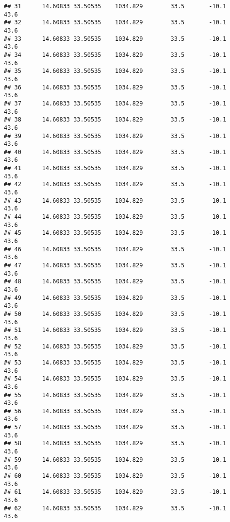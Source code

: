 \documentclass[]{article}
\begin{document}
\begin{verbatim}
## 31      14.60833 33.50535    1034.829        33.5       -10.1              43.6
## 32      14.60833 33.50535    1034.829        33.5       -10.1              43.6
## 33      14.60833 33.50535    1034.829        33.5       -10.1              43.6
## 34      14.60833 33.50535    1034.829        33.5       -10.1              43.6
## 35      14.60833 33.50535    1034.829        33.5       -10.1              43.6
## 36      14.60833 33.50535    1034.829        33.5       -10.1              43.6
## 37      14.60833 33.50535    1034.829        33.5       -10.1              43.6
## 38      14.60833 33.50535    1034.829        33.5       -10.1              43.6
## 39      14.60833 33.50535    1034.829        33.5       -10.1              43.6
## 40      14.60833 33.50535    1034.829        33.5       -10.1              43.6
## 41      14.60833 33.50535    1034.829        33.5       -10.1              43.6
## 42      14.60833 33.50535    1034.829        33.5       -10.1              43.6
## 43      14.60833 33.50535    1034.829        33.5       -10.1              43.6
## 44      14.60833 33.50535    1034.829        33.5       -10.1              43.6
## 45      14.60833 33.50535    1034.829        33.5       -10.1              43.6
## 46      14.60833 33.50535    1034.829        33.5       -10.1              43.6
## 47      14.60833 33.50535    1034.829        33.5       -10.1              43.6
## 48      14.60833 33.50535    1034.829        33.5       -10.1              43.6
## 49      14.60833 33.50535    1034.829        33.5       -10.1              43.6
## 50      14.60833 33.50535    1034.829        33.5       -10.1              43.6
## 51      14.60833 33.50535    1034.829        33.5       -10.1              43.6
## 52      14.60833 33.50535    1034.829        33.5       -10.1              43.6
## 53      14.60833 33.50535    1034.829        33.5       -10.1              43.6
## 54      14.60833 33.50535    1034.829        33.5       -10.1              43.6
## 55      14.60833 33.50535    1034.829        33.5       -10.1              43.6
## 56      14.60833 33.50535    1034.829        33.5       -10.1              43.6
## 57      14.60833 33.50535    1034.829        33.5       -10.1              43.6
## 58      14.60833 33.50535    1034.829        33.5       -10.1              43.6
## 59      14.60833 33.50535    1034.829        33.5       -10.1              43.6
## 60      14.60833 33.50535    1034.829        33.5       -10.1              43.6
## 61      14.60833 33.50535    1034.829        33.5       -10.1              43.6
## 62      14.60833 33.50535    1034.829        33.5       -10.1              43.6

\end{verbatim}
\end{document}
